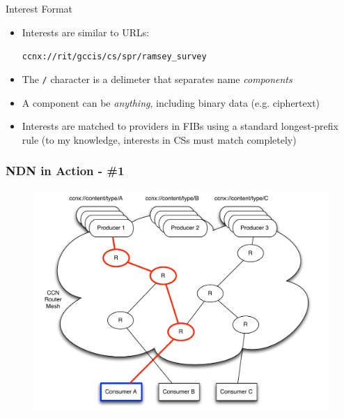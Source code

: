 \documentclass[handout]{beamer}
\begin{document}
\begin{frame}{Interest Format}
	\begin{itemize}
		\item Interests are similar to URLs: 
		\begin{center}
			{\tt ccnx://rit/gccis/cs/spr/ramsey\_survey}
		\end{center}
		\item The {\tt /} character is a delimeter that separates name \emph{components}
		\item A component can be \emph{anything}, including binary data (e.g. ciphertext)
		\item Interests are matched to providers in FIBs using a standard longest-prefix rule (to my knowledge, interests in CSs must match completely)
	\end{itemize}
\end{frame}

\begin{frame}
	\frametitle{NDN in Action - \#1}
	\begin{figure}[h]
		\includegraphics[scale=0.4]{img/ccn_img1.pdf}
	\end{figure}
\end{frame}
\end{document}
